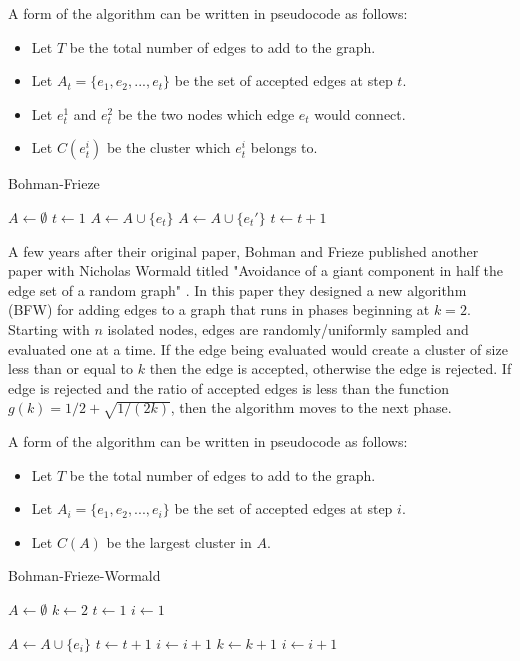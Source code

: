 A form of the algorithm can be written in pseudocode as follows:
\begin{itemize}
	\item Let $T$ be the total number of edges to add to the graph.
	\item Let $A_t = \{e_1, e_2, ..., e_t\}$ be the set of accepted edges at step $t$.
	\item Let $e_t^1$ and $e_t^2$ be the two nodes which edge $e_t$ would connect.
	\item Let $C(e_t^i)$ be the cluster which $e_t^i$ belongs to.
\end{itemize}

\begin{algorithm}
	\caption{Bohman-Frieze}\label{Bohman-Frieze}
	\begin{algorithmic}[1]
		\State $A \gets \emptyset$
		\State $t \gets 1$
				\State $A \gets A \cup \{e_t\}$
			\Else
				\State $A \gets A \cup \{e_t'\}$
			\EndIf
			\State $t \gets t+1$
		\EndWhile
	\EndProcedure
	\end{algorithmic}
\end{algorithm}

A few years after their original paper, Bohman and Frieze published another paper with Nicholas Wormald titled "Avoidance of a giant component in half the edge set of a random graph" \cite{BFW}.
In this paper they designed a new algorithm (BFW) for adding edges to a graph that runs in phases beginning at $k = 2$.
Starting with $n$ isolated nodes, edges are randomly/uniformly sampled and evaluated one at a time.
If the edge being evaluated would create a cluster of size less than or equal to $k$ then the edge is accepted, otherwise the edge is rejected.
If edge is rejected and the ratio of accepted edges is less than the function $g(k) = 1/2 + \sqrt{1/(2k)}$, then the algorithm moves to the next phase.

A form of the algorithm can be written in pseudocode as follows:
\begin{itemize}
	\item Let $T$ be the total number of edges to add to the graph.
	\item Let $A_i = \{e_1, e_2, ..., e_i\}$ be the set of accepted edges at step $i$.
	\item Let $C(A)$ be the largest cluster in $A$.
\end{itemize}

\begin{algorithm}
	\caption{Bohman-Frieze-Wormald}\label{Bohman-Frieze-Wormald}
	\begin{algorithmic}[1]
		\State $A \gets \emptyset$
		\State $k \gets 2$
		\State $t \gets 1$
		\State $i \gets 1$

				\State $A \gets A \cup \{e_i\}$
				\State $t \gets t+1$
				\State $i \gets i+1$
				\State $k \gets k+1$
			\Else
				\State $i \gets i+1$
			\EndIf
		\EndWhile
	\EndProcedure
	\end{algorithmic}
\end{algorithm}



